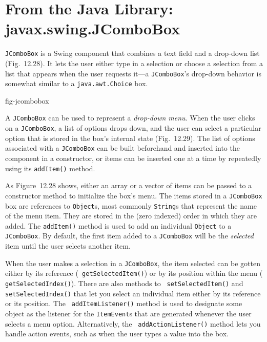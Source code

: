 \section{From the Java Library: \\ javax.swing.JComboBox}
\label{fromthe-java-libraryjavaxswing-j-combo-box}

 {\tt JComboBox} is a Swing component that combines a text field and
a drop-down list (Fig.~12.28).  It lets the user either
type in a selection or choose a selection from a list that appears
when the user requests it---a {\tt JComboBox}'s drop-down behavior is
somewhat similar to a {\tt java.awt.Choice} box.


{fig-jcombobox}

A {\tt JComboBox} can be used to represent a {\it drop-down menu}.
When the user clicks on a {\tt JComboBox}, a list of options drops
down, and the user can select a particular option that is stored in
the box's internal state (Fig.~12.29).  The list of
options associated with a {\tt JComboBox} can be built beforehand and
inserted into the component in a constructor, or items can be inserted
one at a time by repeatedly using its {\tt addItem()} method.

As Figure~12.28 shows, either an array or a vector of items
can be passed to a constructor method to initialize the box's menu.
The items stored in a {\tt JComboBox} box are references to
{\tt Object}s, most commonly {\tt String}s that represent the name of the
menu item.  They are stored in the (zero indexed) order in which they
are added.   The {\tt addItem()} method is used to add an individual
{\tt Object} to a {\tt JComboBox}.  By default, the first item added
to a {\tt JComboBox} will be the {\it selected} item until the user
selects another item.

When the user makes a selection in a {\tt JComboBox}, the item
selected can be gotten either by its reference ({\tt
getSelectedItem()}) or by its position within the menu ({\tt
getSelectedIndex()}).  There are also methods to {\tt
set\-SelectedItem()} and {\tt setSelectedIndex()} that let you select
an individual item either by its reference or its position.  The {\tt
addItemListener()} method is used to designate some object as the
listener for the {\tt ItemEvent}s that are generated whenever the user
selects a menu option.  Alternatively, the \mbox{\tt
addActionListener()} method lets you handle action events, such as
when the user types a value into the box.


